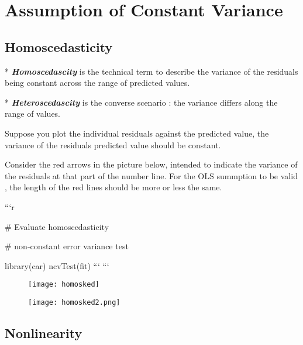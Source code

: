 



\Large
\section{Assumption of Constant Variance}
\subsection*{Homoscedasticity}

* \textbf{\textit{Homoscedascity}} is the technical term to describe the variance of the residuals being constant across the range of predicted values. 

* \textbf{\textit{Heteroscedascity}} is the converse scenario : the variance differs along the range of values.



Suppose you plot the individual residuals against the predicted value, the variance of the residuals predicted value should be constant. 

Consider the red arrows in the picture below, intended to indicate the variance of the residuals at that part of the number line. For the OLS summption to be valid , the length of the red lines should be more or less the same.
\newpage



```{r}	



# Evaluate homoscedasticity

# non-constant error variance test

library(car)
ncvTest(fit)
```
```


\begin{figure}[h!]
\centering
\texttt{[image: homosked]}
\caption{}
\label{fig:homosked}
\end{figure}


\newpage
\begin{figure}[h!]
\centering
\texttt{[image: homosked2.png]}
\caption{}
\label{fig:homosked2}
\end{figure}
\newpage


\subsection{Nonlinearity}



